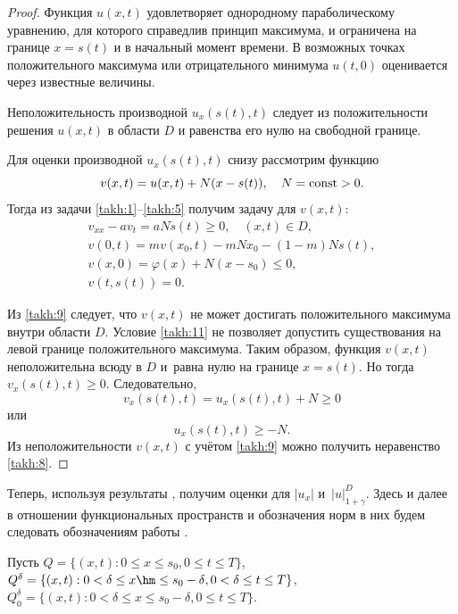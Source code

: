 \begin{proof} Функция $u(x,t)$ удовлетворяет однородному параболическому уравнению, для которого справедлив
принцип максимума, и ограничена на границе $x=s(t)$ и в начальный момент времени. 
В возможных точках положительного максимума или отрицательного минимума $u(t, 0)$  оценивается через
известные величины.

Неположительность производной $u_x(s(t),t)$ следует из положительности решения $u(x,t)$ в области $D$ и равенства его
нулю на свободной границе.

Для оценки производной $u_x(s(t),t)$ снизу рассмотрим функцию
\begin{equation}
v(x,t)=u(x,t)+N(x-s(t)),\quad  N={\rm const}>0.
\label{takh:9}
\end{equation}
Тогда из задачи \eqref{takh:1}--\eqref{takh:5} получим задачу для $v(x,t)$:
\begin{gather}
v_{xx}-av_t=aN\dot{s}(t)\geq 0,\quad  (x,t)\in D,\label{takh:10}
\\
v(0,t)=mv(x_0,t)-mNx_0-(1-m) Ns(t),\label{takh:11}
\\
v(x, 0)=\varphi(x)+N(x-s_0)\leq 0,\label{takh:12}
\\
v(t,s(t))=0.\label{takh:13}
\end{gather}

Из \eqref{takh:9} следует, что $v(x,t)$  не может достигать положительного максимума внутри области $D$. 
Условие \eqref{takh:11} не позволяет допустить существования на левой границе положительного максимума. 
Таким образом, функция $v(x,t)$ неположительна всюду в $D$ и~равна нулю на границе $x=s(t)$. Но тогда $v_x(s(t),t)\geq 0$. Следовательно,
\begin{equation}
v_x(s(t),t)=u_x(s(t),t)+N\geq 0
\label{takh:14}
\end{equation}
или
$$u_x(s(t),t)\geq -N.$$
Из неположительности $v(x,t)$ с учётом \eqref{takh:9} можно получить
неравенство \eqref{takh:8}.\end{proof}

\smallskip

Теперь, используя результаты \cite{takh:bib:6}, получим оценки для $|u_x|$ и~$|u|^{D}_{1+\gamma}$. 
Здесь и далее в отношении функциональных пространств и обозначения норм в них будем следовать обозначениям
работы \cite{takh:bib:6}.

Пусть
$Q=\{(x,t) : 0\leq x\leq s_0, 0\leq t\leq T\}$,
$Q^{\delta}=\{(x,t) : 0<\delta\leq x \hm\leq {s_0-\delta}, 0<\delta\leq t\leq T\}$,
$
Q^{\delta}_{0}=\{(x,t) : 0<\delta\leq x\leq s_0-\delta, 0\leq t\leq T\}$.


